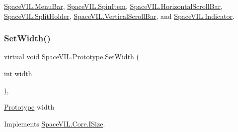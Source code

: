 \mbox{\hyperlink{class_space_v_i_l_1_1_menu_bar_a999e99bd760bb19092d309dff262ea5e}{Space\+V\+I\+L.\+Menu\+Bar}}, \mbox{\hyperlink{class_space_v_i_l_1_1_spin_item_a4a1bd42da119fb072ed70c1026740591}{Space\+V\+I\+L.\+Spin\+Item}}, \mbox{\hyperlink{class_space_v_i_l_1_1_horizontal_scroll_bar_ab871a5c2d291dadd8c902efd361079d5}{Space\+V\+I\+L.\+Horizontal\+Scroll\+Bar}}, \mbox{\hyperlink{class_space_v_i_l_1_1_split_holder_a0489f7db33f2310761600b11ea308c40}{Space\+V\+I\+L.\+Split\+Holder}}, \mbox{\hyperlink{class_space_v_i_l_1_1_vertical_scroll_bar_a94bfbdb137de9b7301e6e07074eb2069}{Space\+V\+I\+L.\+Vertical\+Scroll\+Bar}}, and \mbox{\hyperlink{class_space_v_i_l_1_1_indicator_aa9233e9dda656a3634bcc3ace59c00dc}{Space\+V\+I\+L.\+Indicator}}.

\mbox{\label{class_space_v_i_l_1_1_prototype_a6a4f1b9581f4d18f1c3a3e287d4b2a2b}} 
\subsubsection{\texorpdfstring{Set\+Width()}{SetWidth()}}
{\footnotesize\ttfamily virtual void Space\+V\+I\+L.\+Prototype.\+Set\+Width (\begin{DoxyParamCaption}\item[{int}]{width }\end{DoxyParamCaption})\hspace{0.3cm}{\ttfamily [inline]}, {\ttfamily [virtual]}}



\mbox{\hyperlink{class_space_v_i_l_1_1_prototype}{Prototype}} width 



Implements \mbox{\hyperlink{interface_space_v_i_l_1_1_core_1_1_i_size}{Space\+V\+I\+L.\+Core.\+I\+Size}}.



